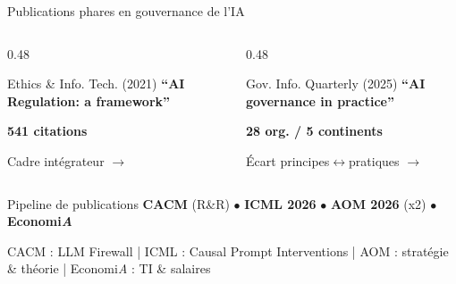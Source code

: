 \documentclass[aspectratio=169,11pt]{beamer}
\begin{document}
\begin{frame}{Publications phares en gouvernance de l'IA}
  \begin{columns}[T]
    \begin{column}{0.48\textwidth}
      \begin{block}{Ethics \& Info. Tech. (2021)}
        \centering
        \textbf{``AI Regulation: a framework''}
        
        \vspace{0.3em}
        {\Large\textcolor{usheror}{\textbf{541 citations}}}
        
        \vspace{0.3em}
        {\small Cadre intégrateur $\rightarrow$ }
      \end{block}
    \end{column}
    \begin{column}{0.48\textwidth}
      \begin{block}{Gov. Info. Quarterly (2025)}
        \centering
        \textbf{``AI governance in practice''}
        
        \vspace{0.3em}
        {\Large\textcolor{ushervert}{\textbf{28 org. / 5 continents}}}
        
        \vspace{0.3em}
        {\small Écart principes$\leftrightarrow$pratiques $\rightarrow$ }
      \end{block}
    \end{column}
  \end{columns}
  
  \vspace{0.5em}
  \begin{alertblock}{Pipeline de publications}
    \textbf{CACM} (R\&R) $\bullet$ \textbf{ICML 2026} $\bullet$ \textbf{AOM 2026} (x2) $\bullet$ \textbf{Economi\textit{A}}
    
    {\tiny CACM : LLM Firewall | ICML : Causal Prompt Interventions | AOM : stratégie \& théorie | Economi\textit{A} : TI \& salaires}
  \end{alertblock}
\end{frame}
\end{document}
